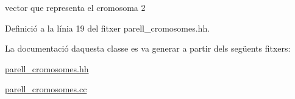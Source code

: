 vector que representa el cromosoma 2 



Definició a la línia 19 del fitxer parell\+\_\+cromosomes.\+hh.



La documentació d\textquotesingle{}aquesta classe es va generar a partir dels següents fitxers\+:\begin{DoxyCompactItemize}
\item 
\hyperlink{parell__cromosomes_8hh}{parell\+\_\+cromosomes.\+hh}\item 
\hyperlink{parell__cromosomes_8cc}{parell\+\_\+cromosomes.\+cc}\end{DoxyCompactItemize}

